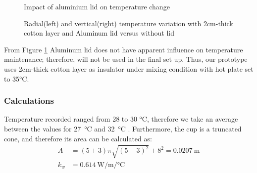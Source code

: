 \begin{figure}[h!] %
\caption*{Impact of aluminium lid on temperature change}
   \begin{minipage}{0.45\textwidth}
       \centering
   \end{minipage}
   \begin{minipage}{0.45\textwidth}
       \centering
   \end{minipage}
   \caption{Radial(left) and vertical(right) temperature variation with 2cm-thick cotton layer and Aluminum lid versus without lid}
	\label{gr:LidComparison}
\end{figure}

From Figure \ref{gr:LidComparison} Aluminum lid does not have apparent influence on temperature maintenance; therefore, will not be used in the final set up. Thus, our prototype uses 2cm-thick cotton layer as insulator under mixing condition with hot plate set to 35\si{\celsius}.

\subsubsection{Calculations}
Temperature recorded ranged from 28 to 30 \si{\celsius}, therefore we take an average between the values for \SI{27}{\celsius} and \SI{32}{\celsius} \cite{doi:10.1063/1.555963}. Furthermore, the cup is a truncated cone, and therefore its area can be calculated as:
\begin{equation}
    \begin{split}
        A &= (5+3)\pi \sqrt{{(5-3)}^2} + 8^2 = \SI{0.0207}{\meter} \\
        k_w &= \SI{0.614}{\watt\per\meter\per\celsius}
    \end{split}
\end{equation}

